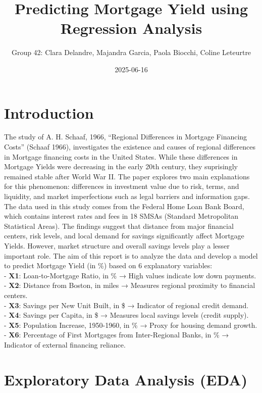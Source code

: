 \documentclass[
  12pt,
]{article}
\title{\textbf{Predicting Mortgage Yield using Regression Analysis}}
\author{Group 42: Clara Delandre, Majandra Garcia, Paola Biocchi, Coline
Leteurtre}
\date{2025-06-16}
\begin{document}
\maketitle

\section{Introduction}\label{introduction}

The study of A. H. Schaaf, 1966, ``Regional Differences in Mortgage
Financing Costs'' (Schaaf 1966), investigates the existence and causes
of regional differences in Mortgage financing costs in the United
States. While these differences in Mortgage Yields were decreasing in
the early 20th century, they suprisingly remained stable after World War
II. The paper explores two main explanations for this phenomenon:
differences in investment value due to risk, terms, and liquidity, and
market imperfections such as legal barriers and information gaps.
\vspace{0.5pt} The data used in this study comes from the Federal Home
Loan Bank Board, which contains interest rates and fees in 18 SMSAs
(Standard Metropolitan Statistical Areas). The findings suggest that
distance from major financial centers, risk levels, and local demand for
savings significantly affect Mortgage Yields. However, market structure
and overall savings levels play a lesser important role. \vspace{0.5pt}
The aim of this report is to analyze the data and develop a model to
predict Mortgage Yield (in \%) based on 6 explanatory variables:\\
- \textbf{X1}: Loan-to-Mortgage Ratio, in \% → High values indicate low
down payments.\\
- \textbf{X2}: Distance from Boston, in miles → Measures regional
proximity to financial centers.\\
- \textbf{X3}: Savings per New Unit Built, in \$ → Indicator of regional
credit demand.\\
- \textbf{X4}: Savings per Capita, in \$ → Measures local savings levels
(credit supply).\\
- \textbf{X5}: Population Increase, 1950-1960, in \% → Proxy for housing
demand growth.\\
- \textbf{X6}: Percentage of First Mortgages from Inter-Regional Banks,
in \% → Indicator of external financing reliance.

\section{Exploratory Data Analysis
(EDA)}\label{exploratory-data-analysis-eda}
\end{document}
